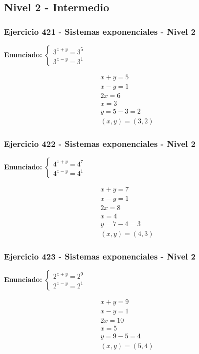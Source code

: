 \documentclass[12pt,a4paper]{article}
\begin{document}
\newpage

\subsection*{Nivel 2 - Intermedio}

\subsubsection*{Ejercicio 421 - Sistemas exponenciales - Nivel 2}
\textbf{Enunciado:} \(\begin{cases} 3^{x+y}=3^{5}\\ 3^{x-y}=3^{1}\end{cases}\)

\[
\begin{aligned}
x+y=5\\
x-y=1\\
2x=6\\
x=3\\
y=5-3=2\\
\boxed{(x,y)=(3,2)}
\end{aligned}
\]


\subsubsection*{Ejercicio 422 - Sistemas exponenciales - Nivel 2}
\textbf{Enunciado:} \(\begin{cases} 4^{x+y}=4^{7}\\ 4^{x-y}=4^{1}\end{cases}\)

\[
\begin{aligned}
x+y=7\\
x-y=1\\
2x=8\\
x=4\\
y=7-4=3\\
\boxed{(x,y)=(4,3)}
\end{aligned}
\]


\subsubsection*{Ejercicio 423 - Sistemas exponenciales - Nivel 2}
\textbf{Enunciado:} \(\begin{cases} 2^{x+y}=2^{9}\\ 2^{x-y}=2^{1}\end{cases}\)

\[
\begin{aligned}
x+y=9\\
x-y=1\\
2x=10\\
x=5\\
y=9-5=4\\
\boxed{(x,y)=(5,4)}
\end{aligned}
\]
\end{document}
